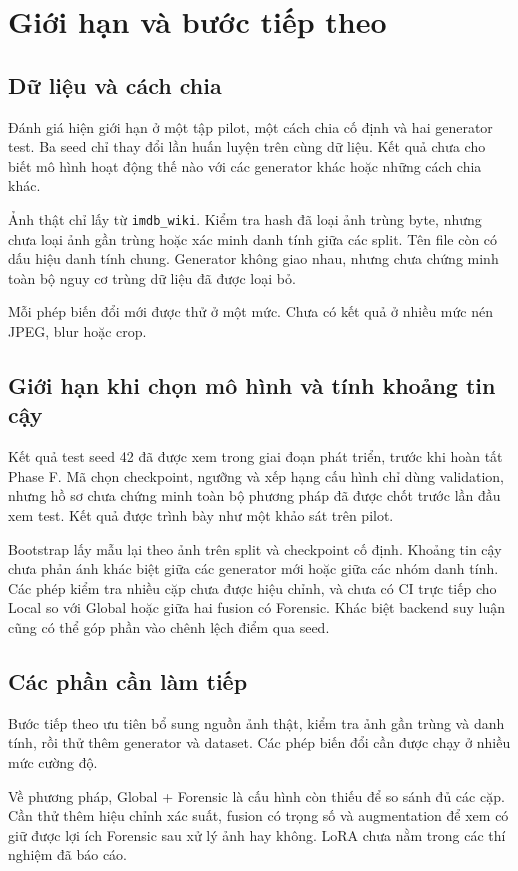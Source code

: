 \section{Giới hạn và bước tiếp theo}
\subsection{Dữ liệu và cách chia}
Đánh giá hiện giới hạn ở một tập pilot, một cách chia cố định và hai generator test. Ba seed chỉ thay đổi lần huấn luyện trên cùng dữ liệu. Kết quả chưa cho biết mô hình hoạt động thế nào với các generator khác hoặc những cách chia khác.

Ảnh thật chỉ lấy từ \texttt{imdb\_wiki}. Kiểm tra hash đã loại ảnh trùng byte, nhưng chưa loại ảnh gần trùng hoặc xác minh danh tính giữa các split. Tên file còn có dấu hiệu danh tính chung. Generator không giao nhau, nhưng chưa chứng minh toàn bộ nguy cơ trùng dữ liệu đã được loại bỏ.

Mỗi phép biến đổi mới được thử ở một mức. Chưa có kết quả ở nhiều mức nén JPEG, blur hoặc crop.

\subsection{Giới hạn khi chọn mô hình và tính khoảng tin cậy}
Kết quả test seed 42 đã được xem trong giai đoạn phát triển, trước khi hoàn tất Phase F. Mã chọn checkpoint, ngưỡng và xếp hạng cấu hình chỉ dùng validation, nhưng hồ sơ chưa chứng minh toàn bộ phương pháp đã được chốt trước lần đầu xem test. Kết quả được trình bày như một khảo sát trên pilot.

Bootstrap lấy mẫu lại theo ảnh trên split và checkpoint cố định. Khoảng tin cậy chưa phản ánh khác biệt giữa các generator mới hoặc giữa các nhóm danh tính. Các phép kiểm tra nhiều cặp chưa được hiệu chỉnh, và chưa có CI trực tiếp cho Local so với Global hoặc giữa hai fusion có Forensic. Khác biệt backend suy luận cũng có thể góp phần vào chênh lệch điểm qua seed.

\subsection{Các phần cần làm tiếp}
Bước tiếp theo ưu tiên bổ sung nguồn ảnh thật, kiểm tra ảnh gần trùng và danh tính, rồi thử thêm generator và dataset. Các phép biến đổi cần được chạy ở nhiều mức cường độ.

Về phương pháp, Global + Forensic là cấu hình còn thiếu để so sánh đủ các cặp. Cần thử thêm hiệu chỉnh xác suất, fusion có trọng số và augmentation để xem có giữ được lợi ích Forensic sau xử lý ảnh hay không. LoRA chưa nằm trong các thí nghiệm đã báo cáo.
